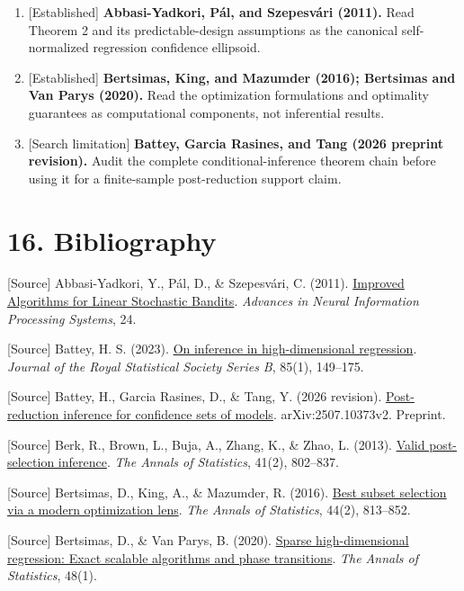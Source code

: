 \documentclass[
  english,
  11pt,
  a4paper,
]{article}
\begin{document}
\begin{enumerate}
\item
  {[}Established{]} \textbf{Abbasi-Yadkori, Pál, and Szepesvári (2011).}
  Read Theorem 2 and its predictable-design assumptions as the canonical
  self-normalized regression confidence ellipsoid.
\item
  {[}Established{]} \textbf{Bertsimas, King, and Mazumder (2016);
  Bertsimas and Van Parys (2020).} Read the optimization formulations
  and optimality guarantees as computational components, not inferential
  results.
\item
  {[}Search limitation{]} \textbf{Battey, Garcia Rasines, and Tang (2026
  preprint revision).} Audit the complete conditional-inference theorem
  chain before using it for a finite-sample post-reduction support
  claim.
\end{enumerate}

\section{16. Bibliography}\label{bibliography}

{[}Source{]} Abbasi-Yadkori, Y., Pál, D., \& Szepesvári, C. (2011).
\href{https://proceedings.neurips.cc/paper/2011/hash/e1d5be1c7f2f456670de3d53c7b54f4a-Abstract.html}{Improved
Algorithms for Linear Stochastic Bandits}. \emph{Advances in Neural
Information Processing Systems}, 24.

{[}Source{]} Battey, H. S. (2023).
\href{https://doi.org/10.1093/jrsssb/qkad001}{On inference in
high-dimensional regression}. \emph{Journal of the Royal Statistical
Society Series B}, 85(1), 149--175.

{[}Source{]} Battey, H., Garcia Rasines, D., \& Tang, Y. (2026
revision). \href{https://arxiv.org/abs/2507.10373}{Post-reduction
inference for confidence sets of models}. arXiv:2507.10373v2. Preprint.

{[}Source{]} Berk, R., Brown, L., Buja, A., Zhang, K., \& Zhao, L.
(2013). \href{https://doi.org/10.1214/12-AOS1077}{Valid post-selection
inference}. \emph{The Annals of Statistics}, 41(2), 802--837.

{[}Source{]} Bertsimas, D., King, A., \& Mazumder, R. (2016).
\href{https://doi.org/10.1214/15-AOS1388}{Best subset selection via a
modern optimization lens}. \emph{The Annals of Statistics}, 44(2),
813--852.

{[}Source{]} Bertsimas, D., \& Van Parys, B. (2020).
\href{https://doi.org/10.1214/18-AOS1804}{Sparse high-dimensional
regression: Exact scalable algorithms and phase transitions}. \emph{The
Annals of Statistics}, 48(1).
\end{document}

